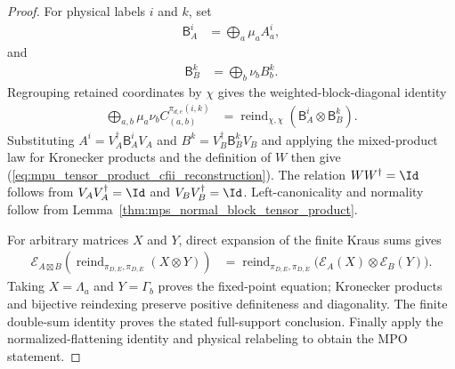 \begin{proof}\leanok
    For physical labels $i$ and $k$, set
    \begin{align}
        \mathsf B_A^i & =\bigoplus_a\mu_aA_a^i,
    \end{align}
    and
    \begin{align}
        \mathsf B_B^k & =\bigoplus_b\nu_bB_b^k.
    \end{align}
    Regrouping retained coordinates by $\chi$ gives the weighted-block-diagonal
    identity
    \begin{align}
        \bigoplus_{a,b}\mu_a\nu_b
        C_{(a,b)}^{\pi_{d,e}(i,k)}
         & =\operatorname{reind}_{\chi,\chi}
        (\mathsf B_A^i\otimes\mathsf B_B^k).
        \label{eq:mpu_tensor_product_weighted_block_diagonal}
    \end{align}
    Substituting $A^i=V_A^\dagger\mathsf B_A^iV_A$ and
    $B^k=V_B^\dagger\mathsf B_B^kV_B$ and applying the mixed-product law for Kronecker
    products and the definition of $W$ then give
    (\ref{eq:mpu_tensor_product_cfii_reconstruction}). The relation
    $W W^\dagger=\Id$ follows from
    $V_AV_A^\dagger=\Id$ and $V_BV_B^\dagger=\Id$. Left-canonicality and normality
    follow from Lemma~\ref{thm:mps_normal_block_tensor_product}.

    For arbitrary matrices $X$ and $Y$, direct expansion of the finite Kraus
    sums gives
    \begin{align}
        \mathcal E_{A\boxtimes B}
        \left(\operatorname{reind}_{\pi_{D,E},\pi_{D,E}}(X\otimes Y)\right)
         & =\operatorname{reind}_{\pi_{D,E},\pi_{D,E}}
        \bigl(\mathcal E_A(X)\otimes\mathcal E_B(Y)\bigr).
    \end{align}
    Taking $X=\Lambda_a$ and $Y=\Gamma_b$ proves the fixed-point equation;
    Kronecker products and bijective reindexing preserve positive definiteness
    and diagonality. The finite double-sum identity proves the stated
    full-support conclusion. Finally apply the normalized-flattening identity
    and physical relabeling to obtain the MPO statement.
\end{proof}


